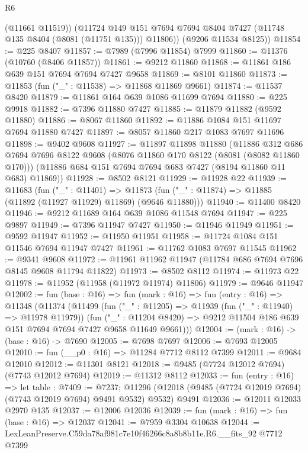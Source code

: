 \begin{lexlean}{R6}
\begin{coremodule}
          (@11661 @11519))
        (@11724 @149 @151 @7694 @7694 @8404 @7427 (@11748 @135 @8404 (@8081 (@11751 @135))) @11806))
      (@9206 @11534 @8125))
@11854 := @225 @8407
@11857 := @7989 (@7996 @11854) @7999
@11860 := @11376 (@10760 (@8406 @11857))
@11861 := @9212 @11860
@11868 := @11861 @186 @639 @151 @7694 @7694 @7427 @9658
@11869 := @8101 @11860
@11873 := @11853 (fun ("_" : @11538) => @11868 @11869 @9661)
@11874 := @11537 @8420
@11879 := @11861 @164 @639 @1086 @11699 @7694
@11880 := @225 @9918
@11882 := @7396 @11880 @7427
@11885 := @11879 @11882 (@9592 @11880)
@11886 := @8067 @11860
@11892 := @11886 @1084 @151 @11697 @7694 @11880 @7427
@11897 := @8057 @11860 @217 @1083 @7697 @11696
@11898 := @9402 @9608
@11927 := @11897
    @11898
    @11880
    (@11886
      @312
      @686
      @7694
      @7696
      @8122
      @9608
      (@8076 @11860 @170 @8122 (@8081 (@8082 @11860 @170)))
      (@11886 @684 @151 @7694 @7694 @683 @7427 (@8194 @11860 @11 @683) @11869))
@11928 := @8502 @8121
@11929 := @11928 @22
@11939 := @11683
    (fun ("_" : @11401) =>
    @11873 (fun ("_" : @11874) => @11885 (@11892 (@11927 @11929) @11869) (@9646 @11880)))
@11940 := @11400 @8420
@11946 := @9212 @11689 @164 @639 @1086 @11548 @7694
@11947 := @225 @9897
@11949 := @7396 @11947 @7427
@11950 := @11946 @11949
@11951 := @9592 @11947
@11952 := @11950 @11951
@11958 := @11724 @1084 @151 @11546 @7694 @11947 @7427
@11961 := @11762 @1083 @7697 @11545
@11962 := @9341 @9608
@11972 := @11961 @11962 @11947 (@11784 @686 @7694 @7696 @8145 @9608 @11794 @11822)
@11973 := @8502 @8112
@11974 := @11973 @22
@11978 := @11952 (@11958 (@11972 @11974) @11806)
@11979 := @9646 @11947
@12002 := fun (base : @16) =>
  fun (mark : @16) =>
  fun (entry : @16) =>
  @11348
    (@11374
      (@11499
        (fun ("_" : @11205) => @11939 (fun ("_" : @11940) => @11978 @11979))
        (fun ("_" : @11204 @8420) =>
        @9212 @11504 @186 @639 @151 @7694 @7694 @7427 @9658 @11649 @9661)))
@12004 := (mark : @16) -> (base : @16) -> @7690
@12005 := @7698 @7697
@12006 := @7693 @12005
@12010 := fun (__p0 : @16) => @11284 @7712 @8112 @7399
@12011 := @9684 @12010
@12012 := @11301 @8121
@12018 := @9485 (@7724 @12012 @7694) (@7743 @12012 @7694)
@12019 := @11312 @8112
@12033 := fun (entry : @16) =>
  let table : @7409 := @7237;
  @11296 (@12018 (@9485 (@7724 @12019 @7694) (@7743 @12019 @7694) @9491 @9532) @9532) @9491
@12036 := @12011 @12033 @2970 @135
@12037 := @12006 @12036
@12039 := fun (mark : @16) => fun (base : @16) => @12037
@12041 := @7959 @3304 @10638
@12044 := LexLeanPreserve.C59da78af981c7e10f46266c8a8b8b11e.R6.__fits_92 @7712 @7399

\end{coremodule}
\end{lexlean}

